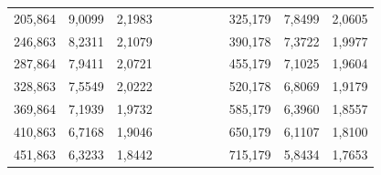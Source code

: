 \documentclass[a4paper,12pt]{article} %
\begin{document}
\begin{enumerate}
\begin{table}[h!]
\begin{tabular}{lllccccclll}
		\multicolumn{1}{|l|}{205,864} & \multicolumn{1}{l|}{9,0099}  & \multicolumn{1}{l|}{2,1983}   &                      &                      &                      &                      & \multicolumn{1}{c|}{} & \multicolumn{1}{l|}{325,179} & \multicolumn{1}{l|}{7,8499}  & \multicolumn{1}{l|}{2,0605}   \\ \cline{1-3} \cline{9-11} 
		\multicolumn{1}{|l|}{246,863} & \multicolumn{1}{l|}{8,2311}  & \multicolumn{1}{l|}{2,1079}   &                      &                      &                      &                      & \multicolumn{1}{c|}{} & \multicolumn{1}{l|}{390,178} & \multicolumn{1}{l|}{7,3722}  & \multicolumn{1}{l|}{1,9977}   \\ \cline{1-3} \cline{9-11} 
		\multicolumn{1}{|l|}{287,864} & \multicolumn{1}{l|}{7,9411}  & \multicolumn{1}{l|}{2,0721}   &                      &                      &                      &                      & \multicolumn{1}{c|}{} & \multicolumn{1}{l|}{455,179} & \multicolumn{1}{l|}{7,1025}  & \multicolumn{1}{l|}{1,9604}   \\ \cline{1-3} \cline{9-11} 
		\multicolumn{1}{|l|}{328,863} & \multicolumn{1}{l|}{7,5549}  & \multicolumn{1}{l|}{2,0222}   &                      &                      &                      &                      & \multicolumn{1}{c|}{} & \multicolumn{1}{l|}{520,178} & \multicolumn{1}{l|}{6,8069}  & \multicolumn{1}{l|}{1,9179}   \\ \cline{1-3} \cline{9-11} 
		\multicolumn{1}{|l|}{369,864} & \multicolumn{1}{l|}{7,1939}  & \multicolumn{1}{l|}{1,9732}   &                      &                      &                      &                      & \multicolumn{1}{c|}{} & \multicolumn{1}{l|}{585,179} & \multicolumn{1}{l|}{6,3960}  & \multicolumn{1}{l|}{1,8557}   \\ \cline{1-3} \cline{9-11} 
		\multicolumn{1}{|l|}{410,863} & \multicolumn{1}{l|}{6,7168}  & \multicolumn{1}{l|}{1,9046}   &                      &                      &                      &                      & \multicolumn{1}{c|}{} & \multicolumn{1}{l|}{650,179} & \multicolumn{1}{l|}{6,1107}  & \multicolumn{1}{l|}{1,8100}   \\ \cline{1-3} \cline{9-11} 
		\multicolumn{1}{|l|}{451,863} & \multicolumn{1}{l|}{6,3233}  & \multicolumn{1}{l|}{1,8442}   &                      &                      &                      &                      & \multicolumn{1}{c|}{} & \multicolumn{1}{l|}{715,179} & \multicolumn{1}{l|}{5,8434}  & \multicolumn{1}{l|}{1,7653}   \\ \cline{1-3} \cline{9-11} 

\end{tabular}
\end{table}
\end{enumerate}
\end{document}
